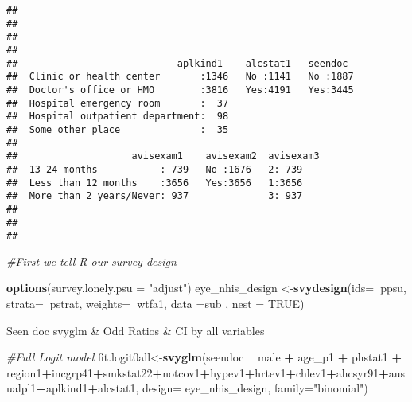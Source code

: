\documentclass[]{article}
\newenvironment{Shaded}{\begin{snugshade}}{\end{snugshade}}
\newcommand{\CommentTok}[1]{\textcolor[rgb]{0.56,0.35,0.01}{\textit{#1}}}
\newcommand{\DataTypeTok}[1]{\textcolor[rgb]{0.13,0.29,0.53}{#1}}
\newcommand{\KeywordTok}[1]{\textcolor[rgb]{0.13,0.29,0.53}{\textbf{#1}}}
\newcommand{\NormalTok}[1]{#1}
\newcommand{\OperatorTok}[1]{\textcolor[rgb]{0.81,0.36,0.00}{\textbf{#1}}}
\newcommand{\OtherTok}[1]{\textcolor[rgb]{0.56,0.35,0.01}{#1}}
\newcommand{\StringTok}[1]{\textcolor[rgb]{0.31,0.60,0.02}{#1}}
\begin{document}
\begin{verbatim}
##                                             
##                                             
##                                             
##                                             
##                            aplkind1    alcstat1   seendoc   
##  Clinic or health center       :1346   No :1141   No :1887  
##  Doctor's office or HMO        :3816   Yes:4191   Yes:3445  
##  Hospital emergency room       :  37                        
##  Hospital outpatient department:  98                        
##  Some other place              :  35                        
##                                                             
##                    avisexam1    avisexam2  avisexam3
##  13-24 months           : 739   No :1676   2: 739   
##  Less than 12 months    :3656   Yes:3656   1:3656   
##  More than 2 years/Never: 937              3: 937   
##                                                     
##                                                     
## 
\end{verbatim}

\begin{Shaded}
\begin{Highlighting}[]
\CommentTok{#First we tell R our survey design}

\KeywordTok{options}\NormalTok{(}\DataTypeTok{survey.lonely.psu =} \StringTok{"adjust"}\NormalTok{)}
\NormalTok{eye_nhis_design <-}\KeywordTok{svydesign}\NormalTok{(}\DataTypeTok{ids=}\OperatorTok{~}\NormalTok{ppsu, }\DataTypeTok{strata=}\OperatorTok{~}\NormalTok{pstrat, }\DataTypeTok{weights=}\OperatorTok{~}\NormalTok{wtfa1, }\DataTypeTok{data =}\NormalTok{sub , }\DataTypeTok{nest =} \OtherTok{TRUE}\NormalTok{)}
\end{Highlighting}
\end{Shaded}

Seen doc svyglm \& Odd Ratios \& CI by all variables

\begin{Shaded}
\begin{Highlighting}[]
\CommentTok{#Full Logit model}
\NormalTok{fit.logit0all<-}\KeywordTok{svyglm}\NormalTok{(seendoc }\OperatorTok{~}\StringTok{ }\NormalTok{male }\OperatorTok{+}\StringTok{ }\NormalTok{age_p1 }\OperatorTok{+}\StringTok{ }\NormalTok{phstat1 }\OperatorTok{+}\StringTok{ }\NormalTok{region1}\OperatorTok{+}\NormalTok{incgrp41}\OperatorTok{+}\NormalTok{smkstat22}\OperatorTok{+}\NormalTok{notcov1}\OperatorTok{+}\NormalTok{hypev1}\OperatorTok{+}\NormalTok{hrtev1}\OperatorTok{+}\NormalTok{chlev1}\OperatorTok{+}\NormalTok{ahcsyr91}\OperatorTok{+}\NormalTok{ausualpl1}\OperatorTok{+}\NormalTok{aplkind1}\OperatorTok{+}\NormalTok{alcstat1,}
                  \DataTypeTok{design=}\NormalTok{ eye_nhis_design,}
                  \DataTypeTok{family=}\StringTok{"binomial"}\NormalTok{)}
\end{Highlighting}
\end{Shaded}
\end{document}

